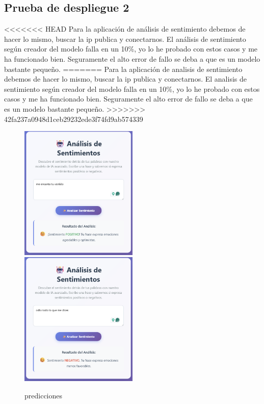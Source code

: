 \documentclass{article}
\begin{document}
	\subsection{Prueba de despliegue 2}

<<<<<<< HEAD
	Para la aplicación de análisis de sentimiento debemos de hacer lo mismo, buscar la ip publica y conectarnos. El análisis de sentimiento según creador del modelo falla en un 10\%, yo lo he probado con estos casos y me ha funcionado bien. Seguramente el alto error de fallo se deba a que es un modelo bastante pequeño.
=======
	Para la aplicación de analisis de sentimiento debemos de hacer lo mismo, buscar la ip publica y conectarnos. El analisis de sentimiento según creador del modelo falla en un 10\%, yo lo he probado con estos casos y me ha funcionado bien. Seguramente el alto error de fallo se deba a que es un modelo bastante pequeño.
>>>>>>> 42fa237a0948d1ceb29232ede3f74fd9ab574339

	\begin{figure}[H]

	\includegraphics[width=0.5\textwidth]{prueba2.png}
	\includegraphics[width=0.5\textwidth]{prueba3.png}
	\caption{predicciones}
	\end{figure}
\end{document}
